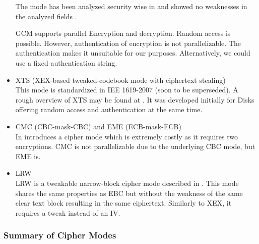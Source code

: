 \begin{itemize}
          The mode has been analyzed security wise in \citeyear{mcgrew2004security} and showed no weaknesses in the analyzed fields \cite{mcgrew2004security}. 

          GCM supports parallel Encryption and decryption. Random access is possible. However, authentication of encryption is not parallelizable. The authentication makes it unsuitable for our purposes. Alternatively, we could use a fixed authentication string.
    \item XTS (XEX-based tweaked-codebook mode with ciphertext stealing)\\
          This mode is standardized in IEE 1619-2007 (soon to be superseded). A rough overview of XTS may be found at \cite{Martin2010}. It was developed initially for Disks offering random access and authentication at the same time. 
    \item CMC (CBC-mask-CBC) and EME (ECB-mask-ECB)\\ 
          In \cite{Halevi_2003} \citeauthor{Halevi_2003} introduces a cipher mode which is extremely costly as it requires two encryptions. CMC is not parallelizable due to the underlying CBC mode, but EME is. 
    \item LRW\\
          LRW is a tweakable narrow-block cipher mode described in \cite{tschorsch:translayeranon}. This mode shares the same properties as EBC but without the weakness of the same clear text block resulting in the same ciphertext. Similarly to XEX, it requires a tweak instead of an IV.
\end{itemize}

\subsubsection{Summary of Cipher Modes}

